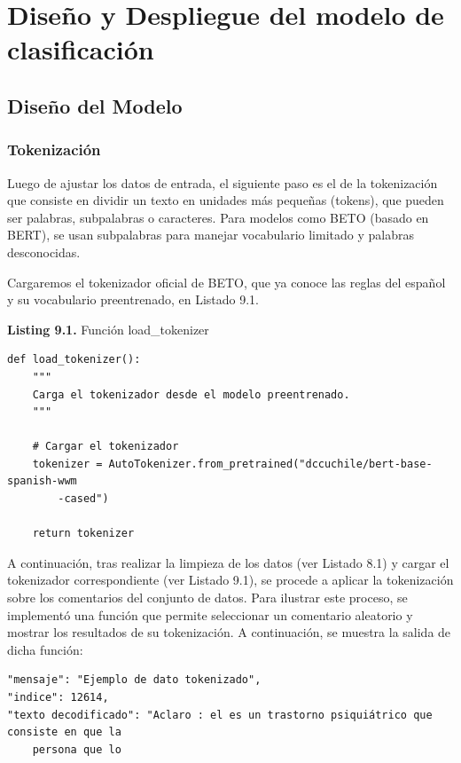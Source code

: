 \chapter{Diseño y Despliegue del modelo de clasificación}

\section{Diseño del Modelo}

\subsection{Tokenización}

Luego de ajustar los datos de entrada, el siguiente paso es el de la tokenización que consiste en dividir un texto en unidades más pequeñas (tokens), que pueden ser palabras, subpalabras o caracteres. Para modelos como BETO (basado en BERT), se usan subpalabras para manejar vocabulario limitado y palabras desconocidas.

Cargaremos el tokenizador oficial de BETO, que ya conoce las reglas del español y su vocabulario preentrenado, en Listado 9.1.

\begin{center}
\textbf{Listing 9.1.} Función load\_tokenizer
\end{center}

\begin{lstlisting}[style=pythoncode]
def load_tokenizer():
    """
    Carga el tokenizador desde el modelo preentrenado.
    """

    # Cargar el tokenizador
    tokenizer = AutoTokenizer.from_pretrained("dccuchile/bert-base-spanish-wwm
        -cased")

    return tokenizer
\end{lstlisting}

A continuación, tras realizar la limpieza de los datos (ver Listado 8.1) y cargar el tokenizador correspondiente (ver Listado 9.1), se procede a aplicar la tokenización sobre los comentarios del conjunto de datos. Para ilustrar este proceso, se implementó una función que permite seleccionar un comentario aleatorio y mostrar los resultados de su tokenización. A continuación, se muestra la salida de dicha función:

\begin{lstlisting}[style=jsoncode]
"mensaje": "Ejemplo de dato tokenizado",
"indice": 12614,
"texto decodificado": "Aclaro : el es un trastorno psiquiátrico que consiste en que la
    persona que lo
\end{lstlisting}









